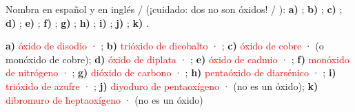 \begin{exercise}
    Nombra en español y en inglés /  (¡cuidado: dos no son óxidos! / ): \textbf{a)} ; \textbf{b)} ; \textbf{c)} ; \textbf{d)} ; \textbf{e)} ; \textbf{f)} ; \textbf{g)} ; \textbf{h)} ; \textbf{i)} ; \textbf{j)} ; \textbf{k)} .
    \begin{solu}
        \textbf{a)} \textcolor{red}{óxido de disodio} · \textcolor{red}{}; \textbf{b)} \textcolor{red}{trióxido de dicobalto} · \textcolor{red}{}; \textbf{c)} \textcolor{red}{óxido de cobre} · \textcolor{red}{} (o monóxido de cobre); \textbf{d)} \textcolor{red}{óxido de diplata} · \textcolor{red}{}; \textbf{e)} \textcolor{red}{óxido de cadmio} · \textcolor{red}{}; \textbf{f)} \textcolor{red}{monóxido de nitrógeno} · \textcolor{red}{}; \textbf{g)} \textcolor{red}{dióxido de carbono} · \textcolor{red}{}; \textbf{h)} \textcolor{red}{pentaóxido de diarsénico} · \textcolor{red}{}; \textbf{i)} \textcolor{red}{trióxido de azufre} · \textcolor{red}{}; \textbf{j)} \textcolor{red}{diyoduro de pentaoxígeno} · \textcolor{red}{} (no es un óxido); \textbf{k)} \textcolor{red}{dibromuro de heptaoxígeno} · \textcolor{red}{} (no es un óxido)
    \end{solu}
\end{exercise}

